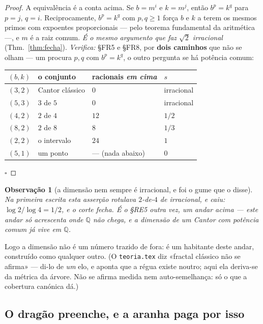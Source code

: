 \documentclass[11pt,a4paper]{article}
\newtheorem{observacao}{Observação}
\newcommand{\code}[1]{\texttt{\small #1}}
\newcommand{\Q}{\mathbb{Q}}
\begin{document}
\begin{proof}
A equivalência é a conta acima. Se $b=m^{i}$ e $k=m^{j}$, então $b^{p}=k^{q}$
para $p=j$, $q=i$. Reciprocamente, $b^{p}=k^{q}$ com $p,q\ge1$ força $b$ e $k$ a
terem os mesmos primos com expoentes proporcionais --- pelo teorema fundamental
da aritmética ---, e $m$ é a raiz comum. \emph{É o mesmo argumento que faz
$\sqrt2$ irracional} (Thm.~\ref{thm:fecha}).
\emph{Verifica:} §FR5 e §FR8, por \textbf{dois caminhos} que não se olham --- um
procura $p,q$ com $b^{p}=k^{q}$, o outro pergunta se há potência comum:
\begin{center}\small
\begin{tabular}{@{}llll@{}}
\toprule
$(b,k)$ & o conjunto & racionais \emph{em cima} & $s$ \\
\midrule
$(3,2)$ & Cantor clássico & $0$ & irracional \\
$(5,3)$ & $3$ de $5$ & $0$ & irracional \\
$(4,2)$ & $2$ de $4$ & $12$ & $1/2$ \\
$(8,2)$ & $2$ de $8$ & $8$ & $1/3$ \\
$(2,2)$ & o intervalo & $24$ & $1$ \\
$(5,1)$ & um ponto & --- (nada abaixo) & $0$ \\
\bottomrule
\end{tabular}
\end{center}
$\square$
\end{proof}

\begin{observacao}[a dimensão nem sempre é irracional, e foi o gume que o disse]
Na primeira escrita esta asserção rotulava $2$-de-$4$ de irracional, e caiu:
$\log2/\log4=1/2$, e o corte \emph{fecha}. É o §RE5 outra vez, um andar acima ---
\emph{este andar só acrescenta onde $\Q$ não chega}, e a dimensão de um Cantor
com potência comum já vive em $\Q$.
\end{observacao}

\noindent Logo a dimensão não é um número trazido de fora: é um habitante deste
andar, construído como qualquer outro. (O \code{teoria.tex} diz «fractal
clássico não se afirma» --- di-lo de \emph{um} elo, e aponta que a régua existe
noutro; aqui ela deriva-se da métrica da árvore. Não se afirma medida nem
auto-semelhança: só o que a cobertura canónica dá.)

\subsection*{O dragão preenche, e a aranha paga por isso}
\end{document}
